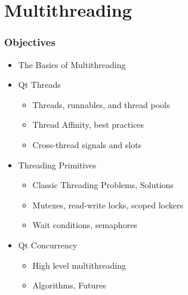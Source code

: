 %
%
%
%

\section{Multithreading}
\begin{slide}[fragile]
\frametitle{Objectives}
\begin{itemize}
\item The Basics of Multithreading
\item Qt Threads
    \begin{itemize}
    \item Threads, runnables, and thread pools
    \item Thread Affinity, best practices
    \item Cross-thread signals and slots
    \end{itemize}
\item Threading Primitives
    \begin{itemize}
    \item Classic Threading Problems, Solutions
    \item Mutexes, read-write locks, scoped lockers 
    \item Wait conditions, semaphores
    \end{itemize}
\item Qt Concurrency
    \begin{itemize}
    \item High level multithreading
    \item Algorithms, Futures
    \end{itemize}
\end{itemize}
\end{slide}



%
